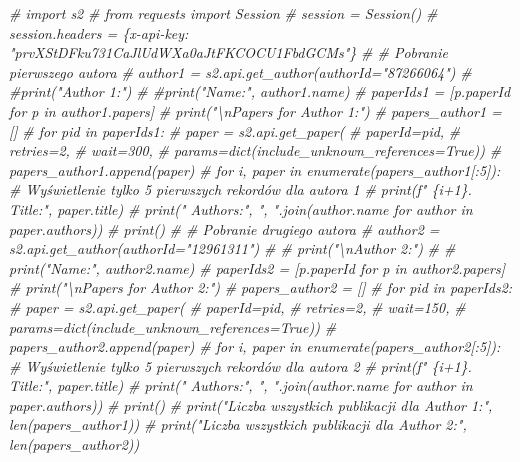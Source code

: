 \documentclass[
  12pt,
]{article}
\newenvironment{Shaded}{\begin{snugshade}}{\end{snugshade}}
\newcommand{\CommentTok}[1]{\textcolor[rgb]{0.56,0.35,0.01}{\textit{#1}}}
\begin{document}
\begin{Shaded}
\begin{Highlighting}[]

\CommentTok{\# import s2}
\CommentTok{\# from requests import Session}
\CommentTok{\# session = Session()}
\CommentTok{\# session.headers = \{\textquotesingle{}x{-}api{-}key\textquotesingle{}: "prvXStDFku731CaJlUdWXa0aJtFKCOCU1FbdGCMs"\}}
\CommentTok{\# \# Pobranie pierwszego autora}
\CommentTok{\# author1 = s2.api.get\_author(authorId="87266064")}
\CommentTok{\# \#print("Author 1:")}
\CommentTok{\# \#print("Name:", author1.name)}
\CommentTok{\# paperIds1 = [p.paperId for p in author1.papers]}
\CommentTok{\# print("\textbackslash{}nPapers for Author 1:")}
\CommentTok{\# papers\_author1 = []}
\CommentTok{\# for pid in paperIds1:}
\CommentTok{\#     paper = s2.api.get\_paper(}
\CommentTok{\#         paperId=pid,}
\CommentTok{\#         retries=2,}
\CommentTok{\#         wait=300,}
\CommentTok{\#         params=dict(include\_unknown\_references=True))}
\CommentTok{\#     papers\_author1.append(paper)}
\CommentTok{\# for i, paper in enumerate(papers\_author1[:5]):  \# Wyświetlenie tylko 5 pierwszych rekordów dla autora 1}
\CommentTok{\#     print(f"  \{i+1\}. Title:", paper.title)}
\CommentTok{\#     print("     Authors:", ", ".join(author.name for author in paper.authors))}
\CommentTok{\#     print()}
\CommentTok{\# \# Pobranie drugiego autora}
\CommentTok{\# author2 = s2.api.get\_author(authorId="12961311")}
\CommentTok{\# \# print("\textbackslash{}nAuthor 2:")}
\CommentTok{\# \# print("Name:", author2.name)}
\CommentTok{\# paperIds2 = [p.paperId for p in author2.papers]}
\CommentTok{\# print("\textbackslash{}nPapers for Author 2:")}
\CommentTok{\# papers\_author2 = []}
\CommentTok{\# for pid in paperIds2:}
\CommentTok{\#     paper = s2.api.get\_paper(}
\CommentTok{\#         paperId=pid,}
\CommentTok{\#         retries=2,}
\CommentTok{\#         wait=150,}
\CommentTok{\#         params=dict(include\_unknown\_references=True))}
\CommentTok{\#     papers\_author2.append(paper)}
\CommentTok{\# for i, paper in enumerate(papers\_author2[:5]):  \# Wyświetlenie tylko 5 pierwszych rekordów dla autora 2}
\CommentTok{\#     print(f"  \{i+1\}. Title:", paper.title)}
\CommentTok{\#     print("     Authors:", ", ".join(author.name for author in paper.authors))}
\CommentTok{\#     print()}
\CommentTok{\# print("Liczba wszystkich publikacji dla Author 1:", len(papers\_author1))}
\CommentTok{\# print("Liczba wszystkich publikacji dla Author 2:", len(papers\_author2))}
\end{Highlighting}
\end{Shaded}
\end{document}
